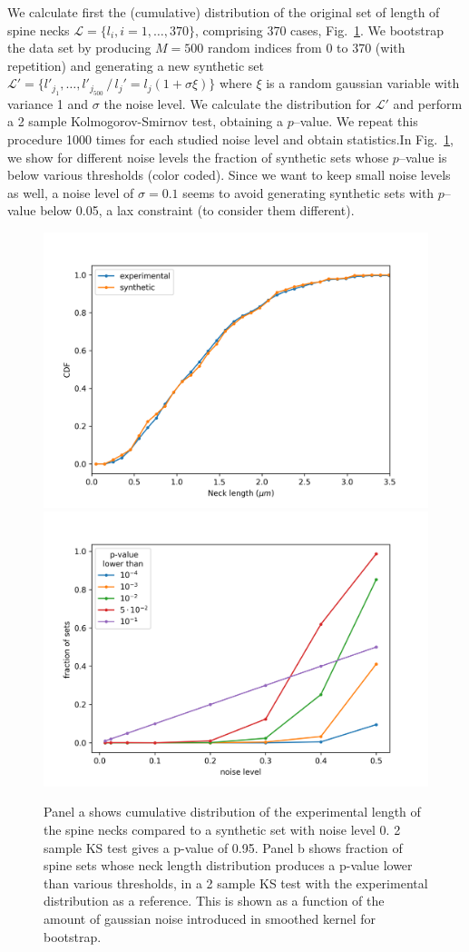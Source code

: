 \documentclass[10pt,letterpaper]{article}
\begin{document}
\def\L{\mathcal{L}}
We calculate first the (cumulative) distribution of the original set of length of spine necks $\L = \{l_i, i=1,\ldots,370\}$, comprising 370 cases, Fig.~\ref{fig:FFT score dist}. We bootstrap the data set by producing $M=500$ random indices from 0 to 370 (with repetition) and generating a new synthetic set $\L' =  \{l'_{j_1},\ldots, l'_{j_{500}}\, /\, l_j' = l_j (1+\sigma\xi) \}$ where $\xi$ is a random gaussian variable with variance 1 and $\sigma$ the noise level. We calculate the distribution for $\L'$ and perform a 2 sample Kolmogorov-Smirnov test, obtaining a $p$--value. We repeat this procedure 1000 times for each studied noise level and obtain statistics.In Fig.~\ref{fig:FFT score dist}, we show for different noise levels the fraction of synthetic sets whose $p$--value is below various thresholds (color coded). Since we want to keep small noise levels as well, a noise level of $\sigma=0.1$ seems to avoid generating synthetic sets with $p$--value below 0.05, a lax constraint (to consider them different).  
\begin{figure}[htb!]
    \centering
    \includegraphics[width=0.48\linewidth]{cdfLnBootstrap}
    \includegraphics[width=0.48\linewidth]{fraction_noiselevel_Ln}
    \caption{Panel a shows cumulative distribution of the experimental length of the spine necks compared to a synthetic set with noise level 0. 2 sample KS test gives a p-value of 0.95. Panel b shows fraction of spine sets whose neck length distribution produces a p-value lower than various thresholds, in a 2 sample KS test with the experimental distribution as a reference. This is shown as a function of the amount of gaussian noise introduced in smoothed kernel for bootstrap.}
    \label{fig:FFT score dist}
\end{figure}
\end{document}
